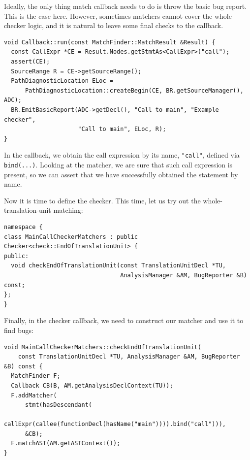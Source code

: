 \documentclass[a4paper,12pt]{article}
\newenvironment{nobr}{\begin{minipage}{\textwidth}\setlength\parskip{1em}
}{\end{minipage}\ignorespacesafterend}
\begin{document}
\begin{nobr}
Ideally, the only thing match callback needs to do is throw the basic bug report. This is the case here. However, sometimes matchers cannot cover the whole checker logic, and it is natural to leave some final checks to the callback.

\begin{lstlisting}[style=cplusplus,numbers=none]
void Callback::run(const MatchFinder::MatchResult &Result) {
  const CallExpr *CE = Result.Nodes.getStmtAs<CallExpr>("call");
  assert(CE);
  SourceRange R = CE->getSourceRange();
  PathDiagnosticLocation ELoc =
      PathDiagnosticLocation::createBegin(CE, BR.getSourceManager(), ADC);
  BR.EmitBasicReport(ADC->getDecl(), "Call to main", "Example checker",
                     "Call to main", ELoc, R);
}
\end{lstlisting}
\end{nobr}

In the callback, we obtain the call expression by its name, \lstinline|"call"|, defined via \lstinline|bind(...)|. Looking at the matcher, we are sure that such call expression is present, so we can assert that we have successfully obtained the statement by name.

\begin{nobr}
Now it is time to define the checker. This time, let us try out the whole-translation-unit matching:
\begin{lstlisting}[style=cplusplus,numbers=none]
namespace {
class MainCallCheckerMatchers : public Checker<check::EndOfTranslationUnit> {
public:
  void checkEndOfTranslationUnit(const TranslationUnitDecl *TU,
                                 AnalysisManager &AM, BugReporter &B) const;
};
}
\end{lstlisting}
\end{nobr}

\begin{nobr}
Finally, in the checker callback, we need to construct our matcher and use it to find bugs:
\begin{lstlisting}[style=cplusplus,numbers=none]
void MainCallCheckerMatchers::checkEndOfTranslationUnit(
    const TranslationUnitDecl *TU, AnalysisManager &AM, BugReporter &B) const {
  MatchFinder F;
  Callback CB(B, AM.getAnalysisDeclContext(TU));
  F.addMatcher(
      stmt(hasDescendant(
          callExpr(callee(functionDecl(hasName("main")))).bind("call"))),
      &CB);
  F.matchAST(AM.getASTContext());
}
\end{lstlisting}
\end{nobr}
\end{document}
